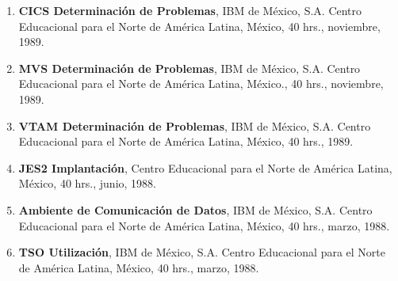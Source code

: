 \begin{enumerate}
\item \textbf{CICS Determinación de Problemas}, IBM de México, S.A. Centro Educacional para el Norte de América Latina, México, 40 hrs., noviembre, 
1989.

\item \textbf{MVS Determinación de Problemas}, IBM de México, S.A. Centro Educacional para el Norte de América Latina, México., 40 hrs., noviembre, 1989.

\item \textbf{VTAM Determinación de Problemas}, IBM de México, S.A. Centro Educacional para el Norte de América Latina, México, 40 hrs., 1989.

\item \textbf{JES2 Implantación}, Centro Educacional para el Norte de América Latina, México, 40 hrs., junio, 1988.

\item \textbf{Ambiente de Comunicación de Datos}, IBM de México, S.A. Centro Educacional para el Norte de América Latina, México, 40 hrs., marzo, 1988. 

\item \textbf{TSO Utilización}, IBM de México, S.A. Centro Educacional para el Norte de América Latina, México, 40 hrs., marzo, 1988.

\end{enumerate}



